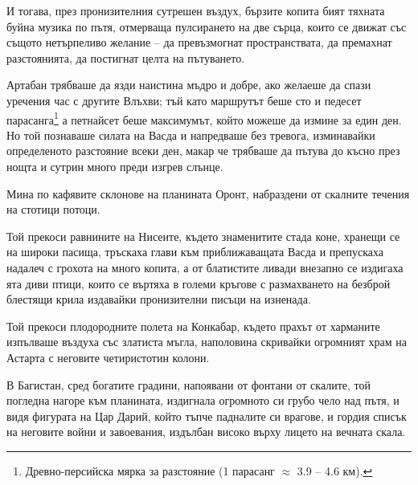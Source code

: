 И тогава, през пронизителния сутрешен въздух, бързите копита бият тяхната буйна
музика по пътя, отмерваща пулсирането на две сърца, които се движат със същото
нетърпеливо желание -- да превъзмогнат пространствата, да премахнат
разстоянията, да постигнат целта на пътуването.

Артабан трябваше да язди наистина мъдро и добре, ако желаеше да спази уречения
час с другите Влъхви; тъй като маршрутът беше сто и педесет
парасанга\footnote{Древно-персийска мярка за разстояние (1 парасанг $\approx$
3.9 -- 4.6 км).} а петнайсет беше максимумът, който можеше да измине за един
ден. Но той познаваше силата на Васда и напредваше без тревога, изминавайки
определеното разстояние всеки ден, макар че трябваше да пътува до късно през
нощта и сутрин много преди изгрев слънце.

Мина по кафявите склонове на планината Оронт, набраздени от скалните течения
на стотици потоци.

Той прекоси равнините на Нисеите, където знаменитите стада коне, хранещи се на
широки пасища, тръскаха глави към приближаващата Васда и препускаха надалеч с
грохота на много копита, а от блатистите ливади внезапно се издигаха ята диви
птици, които се въртяха в големи кръгове с размахването на безброй блестящи
крила издавайки пронизителни писъци на изненада.

Той прекоси плодородните полета на Конкабар, където прахът от харманите
изпълваше въздуха със златиста мъгла, наполовина скривайки огромният храм на
Астарта с неговите четиристотин колони.

В Багистан, сред богатите градини, напоявани от фонтани от скалите, той погледна
нагоре към планината, издигнала огромното си грубо чело над пътя, и видя
фигурата на Цар Дарий, който тъпче падналите си врагове, и гордия списък на
неговите войни и завоевания, издълбан високо върху лицето на вечната скала.

